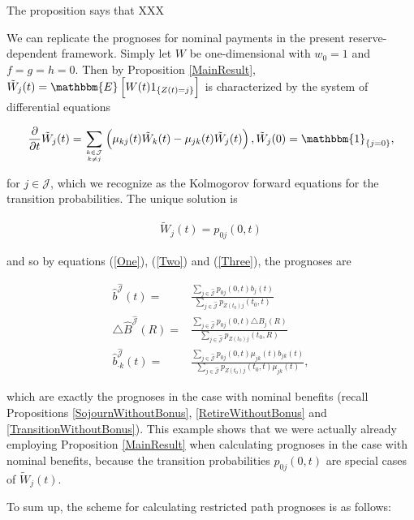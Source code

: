 \documentclass{article}
\newcommand{\1}[1]{\mathbbm{1}_{\left\lbrace #1 \right\rbrace}}
\newcommand{\expec}[1][def]{\mathbbm{E} \left[ #1 \right]}
\theoremstyle{break}
\theoremstyle{remark}
\newenvironment{remark}
  {\pushQED{\qed}\renewcommand{\qedsymbol}{\scalebox{1.4}{$\circ$}}\remarkx}
  {\popQED\endremarkx}
\numberwithin{equation}{section}
\begin{document}
The proposition says that XXX

\begin{remark} \label{WithoutBonusAsSpecialCase}
	We can replicate the prognoses for nominal payments in the present reserve-dependent framework. Simply let $W$ be one-dimensional with $w_0=1$ and $f=g=h=0$. Then by Proposition \ref{MainResult}, $\tilde{W}_j(t)=\expec[W(t) 1_{\{Z(t)=j\}}]$ is characterized by the system of differential equations
	
	\begin{align*}
		\frac{\partial}{\partial t} \tilde{W}_j(t) = \sum_{k \in \mathcal{J} \atop k \neq j} \left( \mu_{kj}(t) \tilde{W}_k(t) - \mu_{jk}(t) \tilde{W}_j(t) \right), \tilde{W}_j(0) = \1{j=0},
	\end{align*}
	
	for $j \in \mathcal{J}$, which we recognize as the Kolmogorov forward equations for the transition probabilities. The unique solution is
	
	\begin{align*}
		\tilde{W}_j(t) = p_{0j}(0,t)
	\end{align*}
	
	and so by equations (\ref{One}), (\ref{Two}) and (\ref{Three}), the prognoses are
	
\begin{align*}
	\hat{b}^{\hat{\mathcal{J}}}(t) =& \frac{\sum_{j \in \hat{\mathcal{J}}} p_{0j}(0,t) b_j(t)}{\sum_{j \in \hat{\mathcal{J}}} p_{Z(t_0)j}(t_0,t)} \\
	\triangle \hat{B}^{\hat{\mathcal{J}}}(R) =& \frac{\sum_{j \in \hat{\mathcal{J}}} p_{0j}(0,t) \triangle B_j(R)}{\sum_{j \in \hat{\mathcal{J}}} p_{Z(t_0)j}(t_0,R)} \\
	\hat{b}_{\cdot k}^{\hat{\mathcal{J}}}(t) =& \frac{\sum_{j \in \hat{\mathcal{J}}} p_{0j}(0,t) \mu_{jk}(t) b_{jk}(t)}{\sum_{j \in \hat{\mathcal{J}}} p_{Z(t_0)j}(t_0,t) \mu_{jk}(t)},
\end{align*}
	
	which are exactly the prognoses in the case with nominal benefits (recall Propositions \ref{SojournWithoutBonus}, \ref{RetireWithoutBonus} and \ref{TransitionWithoutBonus}). This example shows that we were actually already employing Proposition \ref{MainResult} when calculating prognoses in the case with nominal benefits, because the transition probabilities $p_{0j}(0,t)$ are special cases of $\tilde{W}_j(t)$.
\end{remark}

To sum up, the scheme for calculating restricted path prognoses is as follows:
\end{document}
